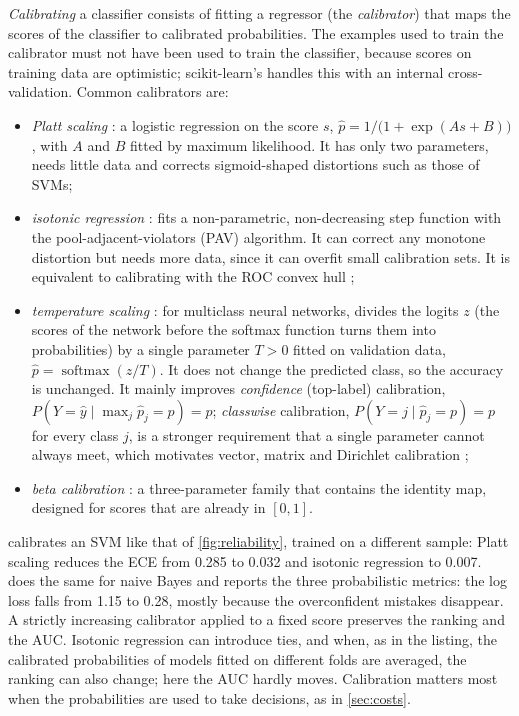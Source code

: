 \emph{Calibrating} a classifier consists of fitting a regressor (the \emph{calibrator}) that
maps the scores of the classifier to calibrated probabilities. The examples used to train the
calibrator must not have been used to train the classifier, because scores on training data
are optimistic; scikit-learn's  handles this with an internal
cross-validation. Common calibrators are:
\begin{itemize}
  \item \emph{Platt scaling} \citep{platt1999probabilistic}: a logistic regression on the
        score $s$, $\hat p=1/\bigl(1+\exp(As+B)\bigr)$, with $A$ and $B$ fitted by maximum
        likelihood. It has only two parameters, needs little data and corrects
        sigmoid-shaped distortions such as those of SVMs;
  \item \emph{isotonic regression} \citep{zadrozny2002transforming}: fits a non-parametric,
        non-decreasing step function with the pool-adjacent-violators (PAV) algorithm. It can
        correct any monotone distortion but needs more data, since it can overfit small
        calibration sets. It is equivalent to calibrating with the ROC convex hull
        \citep{fawcett2007pav};
  \item \emph{temperature scaling} \citep{guo2017calibration}: for multiclass neural networks,
        divides the logits $z$ (the scores of the network before the softmax function turns them into probabilities) by a single parameter $T>0$ fitted on validation data,
        $\hat p=\operatorname{softmax}(z/T)$. It does not change the predicted class, so the
        accuracy is unchanged. It mainly improves \emph{confidence} (top-label) calibration,
        $P(Y=\hat y\mid\max_j\hat p_j=p)=p$; \emph{classwise} calibration, $P(Y=j\mid\hat p_j=p)=p$ for every
        class $j$, is a stronger requirement that a single parameter cannot always meet, which motivates
        vector, matrix and Dirichlet calibration \citep{kull2019beyond};
  \item \emph{beta calibration} \citep{kull2017beta}: a three-parameter family that contains
        the identity map, designed for scores that are already in $[0,1]$.
\end{itemize}

 calibrates an SVM like that of \cref{fig:reliability}, trained on a different sample: Platt scaling reduces
the ECE from 0.285 to 0.032 and isotonic regression to 0.007.  does the
same for naive Bayes and reports the three probabilistic metrics: the log loss falls from 1.15
to 0.28, mostly because the overconfident mistakes disappear. A strictly increasing
calibrator applied to a fixed score preserves the ranking and the AUC. Isotonic regression can
introduce ties, and when, as in the listing, the calibrated probabilities of models fitted on
different folds are averaged, the ranking can also change; here the AUC hardly moves. Calibration matters most when the probabilities are used
to take decisions, as in \cref{sec:costs}.

